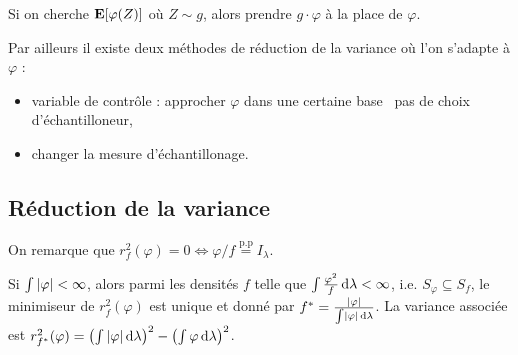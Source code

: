 
\begin{rem}
	Si on cherche $\mathbf{E}[\varphi(Z)]$ où $Z \sim g$, alors prendre $g \cdot \varphi$ à la place de $\varphi$.
\end{rem}

Par ailleurs il existe deux méthodes de réduction de la variance où l'on s'adapte à $\varphi$ :
\begin{itemize}
	\item[\textbullet] variable de contrôle : approcher $\varphi$ dans une certaine base \textrightarrow\ pas de choix d'échantilloneur,
	\item[\textbullet] changer la mesure d'échantillonage.
\end{itemize}


\subsection{Réduction de la variance}

	On remarque que
	$r_f^2(\varphi) = 0
	\iff \varphi / f \overset{\text{p.p}}{=} I_\lambda$.

	\begin{thm}
		Si $\int \left\lvert\varphi\right\rvert < \infty$, alors parmi les densités $f$ telle que $\int \frac{\varphi^2}{f} \mathop{}\mathopen{}\mathrm{d} \lambda < \infty$, i.e. $S_\varphi \subseteq S_f$, le minimiseur de $r_f^2(\varphi)$ est unique et donné par $f^* = \frac{\left\lvert\varphi\right\rvert}{\int \left\lvert\varphi\right\rvert \mathop{}\mathopen{}\mathrm{d} \lambda}$. La variance associée est $r_{f^*}^2(\varphi) = \left( \int \left\lvert\varphi\right\rvert \mathop{}\mathopen{}\mathrm{d} \lambda \right)^2 - \left( \int \varphi \mathop{}\mathopen{}\mathrm{d} \lambda \right)^2$.
	\end{thm}


